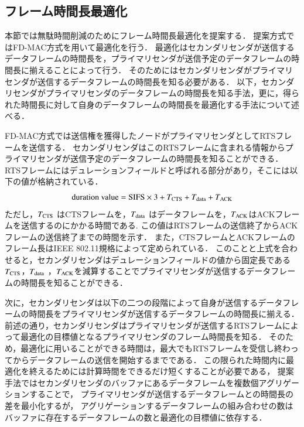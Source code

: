 \documentclass[master]{kuisthesis}		%
\begin{document}
	\subsection{フレーム時間長最適化}\label{sec:frame_opt}
		本節では無駄時間削減のためにフレーム時間長最適化を提案する．
		提案方式ではFD-MAC方式\cite{fdmac}を用いて最適化を行う．
		最適化はセカンダリセンダが送信するデータフレームの時間長を，プライマリセンダが送信予定のデータフレームの時間長に揃えることによって行う．
		そのためにはセカンダリセンダがプライマリセンダが送信するデータフレームの時間長を知る必要がある．
		以下，セカンダリセンダがプライマリセンダのデータフレームの時間長を知る手法，更に，得られた時間長に対して自身のデータフレームの時間長を最適化する手法について述べる．
		\par
		FD-MAC方式では送信権を獲得したノードがプライマリセンダとしてRTSフレームを送信する．
		セカンダリセンダはこのRTSフレームに含まれる情報からプライマリセンダが送信予定のデータフレームの時間長を知ることができる．
		RTSフレームにはデュレーションフィールドと呼ばれる部分があり，そこには以下の値が格納されている．
		\begin{equation}
			{\rm duration\ value} = {\rm SIFS} \times 3 + T_{{\rm CTS}} + T_{{\rm data}} + T_{{\rm ACK}}
		\end{equation}
		ただし，$T_{\rm CTS}$ はCTSフレームを，$T_{\rm data}$ はデータフレームを，$T_{\rm ACK}$はACKフレームを送信するのにかかる時間である.
		この値はRTSフレームの送信終了からACKフレームの送信終了までの時間を示す．
		また，CTSフレームとACKフレームのフレーム長はIEEE 802.11規格によって定められている．
		このことと上式を合わせると，セカンダリセンダはデュレーションフィールドの値から固定長である$T_{\rm CTS}$，$T_{\rm data}$ ，$T_{\rm ACK}$を減算することでプライマリセンダが送信するデータフレームの時間長を知ることができる．
		\par
		次に，セカンダリセンダは以下の二つの段階によって自身が送信するデータフレームの時間長をプライマリセンダが送信するデータフレームの時間長に揃える．
		前述の通り，セカンダリセンダはプライマリセンダが送信するRTSフレームによって最適化の目標値となるプライマリセンダのフレーム時間長を知る．
		そのため，最適化に用いることができる時間は，最大でもRTSフレームを受信し終わってからデータフレームの送信を開始するまでである．
		この限られた時間内に最適化を終えるためには計算時間をできるだけ短くすることが必要である，
		提案手法ではセカンダリセンダのバッファにあるデータフレームを複数個アグリゲーションすることで，
		プライマリセンダが送信するデータフレームとの時間長の差を最小化するが，
		アグリゲーションするデータフレームの組み合わせの数はバッファに存在するデータフレームの数と最適化の目標値に依存する．
\end{document}
